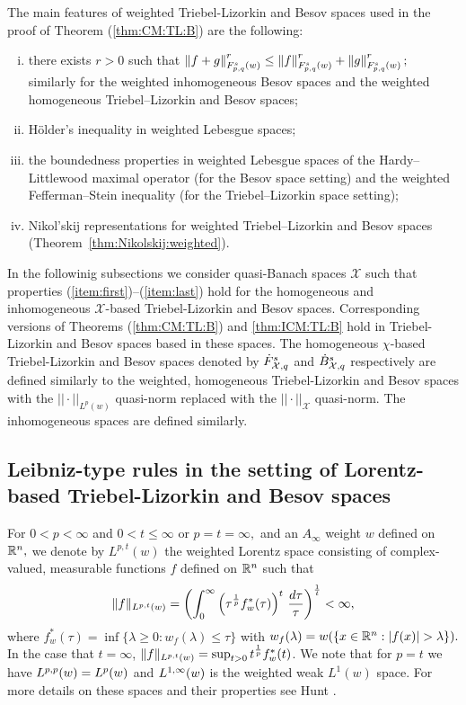 The main features of weighted Triebel-Lizorkin and Besov spaces used in the proof of Theorem (\ref{thm:CM:TL:B}) are the following:
\begin{enumerate}[(i)]
\item\label{item:first} there exists $r>0$ such that $\norm{f+g}{\itlw{p}{s}{q}{w}}^r\le \norm{f}{\itlw{p}{s}{q}{w}}^r+\norm{g}{\itlw{p}{s}{q}{w}}^r;$ similarly for the weighted inhomogeneous  Besov spaces and the weighted homogeneous  Triebel--Lizorkin and Besov spaces;
\item \label{item:second} H\"older's inequality in weighted Lebesgue spaces;
\item \label{item:third}  the boundedness properties in weighted Lebesgue spaces  of the Hardy--Littlewood maximal operator (for the Besov space setting) and the weighted Fefferman--Stein inequality (for the Triebel--Lizorkin space setting);
\item \label{item:last} Nikol'skij representations for weighted Triebel--Lizorkin and Besov spaces (Theorem~\ref{thm:Nikolskij:weighted}).
\end{enumerate}

In the followinig subsections we consider quasi-Banach spaces $\mathcal{X}$ such that properties (\ref{item:first})--(\ref{item:last}) hold for the homogeneous and inhomogeneous $\mathcal{X}$-based Triebel-Lizorkin and Besov spaces. Corresponding versions of Theorems (\ref{thm:CM:TL:B}) and \ref{thm:ICM:TL:B} hold in Triebel-Lizorkin and Besov spaces based in these spaces. The homogeneous $\chi$-based Triebel-Lizorkin and Besov spaces denoted by $\tl{\mathcal{X}}{s}{q}$ and $\bes{\mathcal{X}}{s}{q}$ respectively are defined similarly to the weighted, homogeneous Triebel-Lizorkin and Besov spaces with the $||\cdot||_{L^p(w)}$ quasi-norm replaced with the $||\cdot||_\mathcal{X}$ quasi-norm. The inhomogeneous spaces are defined similarly. 

 \subsection{Leibniz-type rules in the setting of Lorentz-based Triebel-Lizorkin and Besov spaces}
 For $0<p<\infty$ and $0<t\le \infty$ or $p=t=\infty,$ and an $A_\infty$ weight $w$ defined on $\rn,$  we denote by $L^{p,t}(w)$ the weighted Lorentz space consisting of complex-valued, measurable functions $f$ defined on $\rn$ such that
\[
\|f\|_{\lebw{p,t}{w}}=\left(\int_0^\infty \left(\tau^{\frac{1}{p}} f_w^*(\tau)\right)^t\,\frac{d\tau}{\tau}\right)^{\frac{1}{t}}<\infty,
\]
where $f^*_w(\tau)=\inf\{\lambda\ge 0:w_f(\lambda)\le \tau\}$ with
$w_f(\lambda)=w(\{x\in\rn : \abs{f(x)}>\lambda\}).$ 
In the case that $t=\infty$, $\|f\|_{\lebw{p,t}{w}}= \sup_{t>0}t^{\frac{1}{p}}f_w^*(t)$. We note that for $p=t$ we have $\lebw{p,p}{w} = \lebw{p}{w}$ and $\lebw{1,\infty}{w}$ is the weighted weak $L^1(w)$ space. For more details on these spaces and their properties see Hunt \cite{MR0223874}. 

